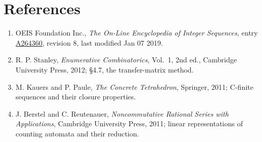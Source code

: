 \documentclass[11pt]{article}
\theoremstyle{definition}
\begin{document}
\section{References}

\begin{enumerate}

\item OEIS Foundation Inc., \emph{The On-Line Encyclopedia of Integer Sequences}, entry \href{https://oeis.org/A264360}{A264360}, revision 8, last modified Jan 07 2019.

\item R. P. Stanley, \emph{Enumerative Combinatorics}, Vol.~1, 2nd ed., Cambridge University Press, 2012; \S4.7, the transfer-matrix method.

\item M. Kauers and P. Paule, \emph{The Concrete Tetrahedron}, Springer, 2011; C-finite sequences and their closure properties.

\item J. Berstel and C. Reutenauer, \emph{Noncommutative Rational Series with Applications}, Cambridge University Press, 2011; linear representations of counting automata and their reduction.

\end{enumerate}
\end{document}
